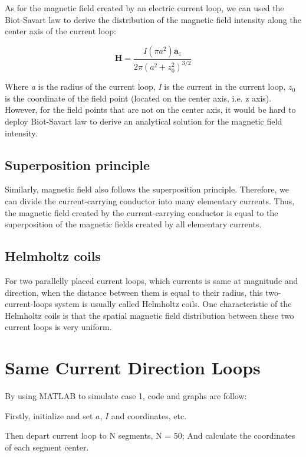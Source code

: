 \documentclass[10pt, journal, final]{IEEEtran}
\begin{document}
As for the magnetic field created by an electric current loop, we can used the Biot-Savart law to derive
the distribution of the magnetic field intensity along the center axis of the current loop:

\begin{equation}
    \mathbf{H} = \frac{I(\pi a^2)\mathbf{a}_z}{2\pi (a^2+z_0^2)^{3/2}}
\end{equation}
\label{eq:loop center}

Where \emph{a} is the radius of the current loop, \emph{I} is the current in the current loop, $z_0$ is the coordinate
of the field point (located on the center axis, i.e. z axis). However, for the field points that are not on the center
axis, it would be hard to deploy Biot-Savart law to derive an analytical solution for the magnetic field intensity.\par

\subsection{
    Superposition principle
}
\label{subsec: Superposition}
Similarly, magnetic field also follows the superposition principle. Therefore, we can divide the current-carrying
conductor into many elementary currents. Thus, the magnetic field created by the current-carrying conductor is equal
to the superposition of the magnetic fields created by all elementary currents.

\subsection{
    Helmholtz coils
}
\label{subsec: Helmholtz}
For two parallelly placed current loops, which currents is same at magnitude and direction,
when the distance between them is equal to their radius, this two-current-loops system is usually called Helmholtz coils.
One characteristic of the Helmholtz coils is that
the spatial magnetic field distribution between these two current loops is very uniform.

\section{
  Same Current Direction Loops
 }
\label{sec: Same Direction}

By using MATLAB to simulate case 1, code and graphs are follow:\par

Firstly, initialize and set $a$, $I$ and coordinates, etc.

Then depart current loop to N segments, N = 50;
And calculate the coordinates of each segment center.

\end{document}
